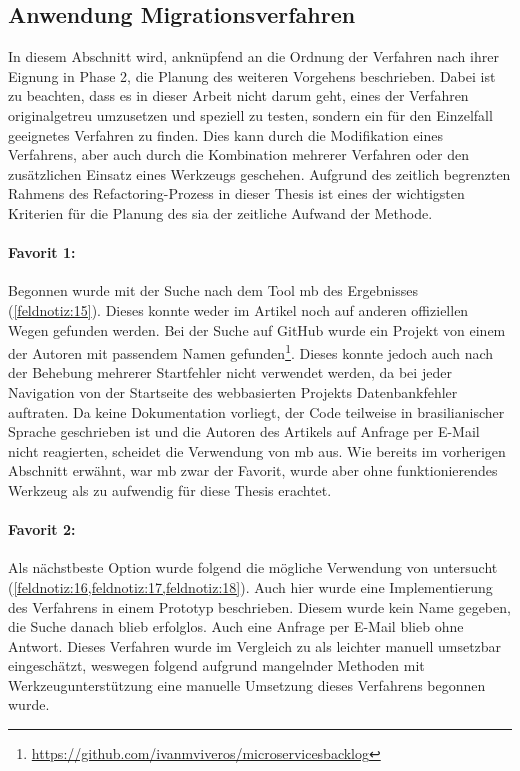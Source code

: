 \subsection{Anwendung Migrationsverfahren}
\label{sec:anwendung-verfahren}
In diesem Abschnitt wird, anknüpfend an die Ordnung der Verfahren nach ihrer Eignung in Phase 2, die Planung des weiteren Vorgehens beschrieben.
Dabei ist zu beachten, dass es in dieser Arbeit nicht darum geht, eines der Verfahren originalgetreu umzusetzen und speziell zu testen, sondern ein für den Einzelfall geeignetes Verfahren zu finden. 
Dies kann durch die Modifikation eines Verfahrens, aber auch durch die Kombination mehrerer Verfahren oder den zusätzlichen Einsatz eines Werkzeugs geschehen.
Aufgrund des zeitlich begrenzten Rahmens des Refactoring-Prozess in dieser Thesis ist eines der wichtigsten Kriterien für die Planung des \gls{sia} der zeitliche Aufwand der Methode.

\paragraph{Favorit 1:} Begonnen wurde mit der Suche nach dem Tool \gls{mb} des Ergebnisses  (\cref{feldnotiz:15}).
Dieses konnte weder im Artikel noch auf anderen offiziellen Wegen gefunden werden.
Bei der Suche auf GitHub wurde ein Projekt von einem der Autoren mit passendem Namen gefunden\footnote{\url{https://github.com/ivanmviveros/microservicesbacklog}}.
Dieses konnte jedoch auch nach der Behebung mehrerer Startfehler nicht verwendet werden, da bei jeder Navigation von der Startseite des webbasierten Projekts Datenbankfehler auftraten.
Da keine Dokumentation vorliegt, der Code teilweise in brasilianischer Sprache geschrieben ist und die Autoren des Artikels auf Anfrage per E-Mail nicht reagierten, scheidet die Verwendung von \gls{mb} aus.
Wie bereits im vorherigen Abschnitt erwähnt, war \gls{mb} zwar der Favorit, wurde aber ohne funktionierendes Werkzeug als zu aufwendig für diese Thesis erachtet.

\paragraph{Favorit 2:} Als nächstbeste Option wurde folgend die mögliche Verwendung von  untersucht (\cref{feldnotiz:16,feldnotiz:17,feldnotiz:18}).
Auch hier wurde eine Implementierung des Verfahrens in einem Prototyp beschrieben.
Diesem wurde kein Name gegeben, die Suche danach blieb erfolglos.
Auch eine Anfrage per E-Mail blieb ohne Antwort.
Dieses Verfahren wurde im Vergleich zu   als leichter manuell umsetzbar eingeschätzt, weswegen folgend aufgrund mangelnder Methoden mit Werkzeugunterstützung eine manuelle Umsetzung dieses Verfahrens begonnen wurde.

